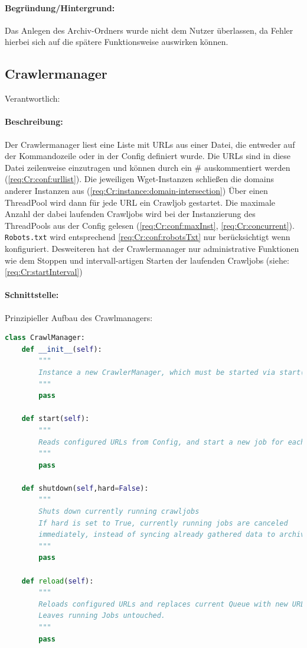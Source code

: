 \paragraph{Begründung/Hintergrund:}
\label{par:begr_ndung_}
Das Anlegen des Archiv-Ordners wurde nicht dem Nutzer überlassen, da
Fehler hierbei sich auf die spätere Funktionsweise auswirken können.


\subsection{Crawlermanager}
\label{sub:crawlermanager}
Verantwortlich: \ci 

\paragraph{Beschreibung:}
\label{par:beschreibung_}
Der Crawlermanager liest eine Liste mit URLs aus einer Datei, die entweder auf der Kommandozeile oder in
der Config definiert wurde. Die URLs sind in diese Datei zeilenweise einzutragen und können durch ein \# auskommentiert werden (\ref{req:Cr:conf:urllist}). Die jeweiligen Wget-Instanzen schließen die domains anderer Instanzen aus (\ref{req:Cr:instance:domain-intersection})
Über einen ThreadPool wird dann für jede URL ein Crawljob gestartet. Die maximale Anzahl der dabei laufenden Crawljobs wird bei
der Instanzierung des ThreadPools aus der Config gelesen (\ref{req:Cr:conf:maxInst}, \ref{req:Cr:concurrent}). 
\texttt{Robots.txt} wird entsprechend \ref{req:Cr:conf:robotsTxt} nur berücksichtigt wenn konfiguriert.
Desweiteren hat der Crawlermanager nur administrative Funktionen wie dem Stoppen und intervall-artigen Starten der laufenden Crawljobs (siehe: \ref{req:Cr:startInterval})

\paragraph{Schnittstelle:}
\label{par:schnittstelle_}
Prinzipieller Aufbau des Crawlmanagers:
\begin{lstlisting}[language=python]
class CrawlManager:
    def __init__(self):
        """
        Instance a new CrawlerManager, which must be started via start()
        """
        pass

    def start(self):
        """
        Reads configured URLs from Config, and start a new job for each
        """
        pass

    def shutdown(self,hard=False): 
        """
        Shuts down currently running crawljobs
        If hard is set to True, currently running jobs are canceled
        immediately, instead of syncing already gathered data to archive.
        """
        pass

    def reload(self):
        """
        Reloads configured URLs and replaces current Queue with new URLs.
        Leaves running Jobs untouched.
        """
        pass
\end{lstlisting}

